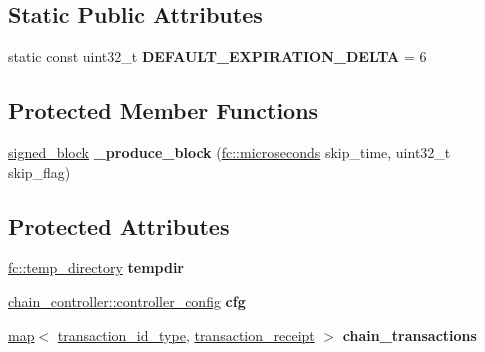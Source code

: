 \subsection*{Static Public Attributes}
\begin{DoxyCompactItemize}
\item 
\mbox{\label{classaacio_1_1testing_1_1base__tester_aaead4232151a24b7f6ecb599c69117e7}} 
static const uint32\+\_\+t {\bfseries D\+E\+F\+A\+U\+L\+T\+\_\+\+E\+X\+P\+I\+R\+A\+T\+I\+O\+N\+\_\+\+D\+E\+L\+TA} = 6
\end{DoxyCompactItemize}
\subsection*{Protected Member Functions}
\begin{DoxyCompactItemize}
\item 
\mbox{\label{classaacio_1_1testing_1_1base__tester_ab7930dcf3941084cae7bf50f8baf4b95}} 
\mbox{\hyperlink{structaacio_1_1chain_1_1signed__block}{signed\+\_\+block}} {\bfseries \+\_\+produce\+\_\+block} (\mbox{\hyperlink{classfc_1_1microseconds}{fc\+::microseconds}} skip\+\_\+time, uint32\+\_\+t skip\+\_\+flag)
\end{DoxyCompactItemize}
\subsection*{Protected Attributes}
\begin{DoxyCompactItemize}
\item 
\mbox{\label{classaacio_1_1testing_1_1base__tester_a0630031ecb2bb3ddfe42214589115818}} 
\mbox{\hyperlink{classfc_1_1temp__directory}{fc\+::temp\+\_\+directory}} {\bfseries tempdir}
\item 
\mbox{\label{classaacio_1_1testing_1_1base__tester_aa80e02a77e74081a385b79423869e358}} 
\mbox{\hyperlink{structaacio_1_1chain_1_1chain__controller_1_1controller__config}{chain\+\_\+controller\+::controller\+\_\+config}} {\bfseries cfg}
\item 
\mbox{\label{classaacio_1_1testing_1_1base__tester_a6ac5c2a5d5639161cba53f82bd0eaae3}} 
\mbox{\hyperlink{classstd_1_1map}{map}}$<$ \mbox{\hyperlink{classfc_1_1sha256}{transaction\+\_\+id\+\_\+type}}, \mbox{\hyperlink{structaacio_1_1chain_1_1transaction__receipt}{transaction\+\_\+receipt}} $>$ {\bfseries chain\+\_\+transactions}
\end{DoxyCompactItemize}


